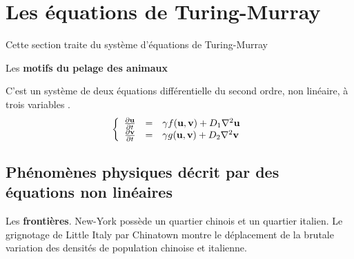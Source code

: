 %
\section{Les équations de Turing-Murray}
%
Cette section traite du système d'équations de Turing-Murray

Les {\bf motifs du pelage des animaux} \cite{pelage-animaux} \label{vidiani}
 \cite{motifs-pelage} \label{bejjani}

C'est un système de deux équations différentielle du second ordre, non linéaire, à trois variables  \cite{pelage-animaux} \label{vidiani}.
\[
\left\{
   \begin{array}{r c l}
      \frac{\partial{\bf u}}{\partial t}  & = &  \gamma f({\bf u},{\bf v}) + D_1\nabla^2{\bf u} \\
      \frac{\partial{\bf v}}{\partial t}  & = &  \gamma g({\bf u},{\bf v}) + D_2\nabla^2{\bf v}
   \end{array}
\right.
\]

%
\subsection{Phénomènes physiques décrit par des équations non linéaires}


Les {\bf frontières}. New-York possède un quartier chinois et un quartier italien. Le grignotage de Little Italy par Chinatown montre le déplacement de la brutale variation des densités de population chinoise et italienne.

